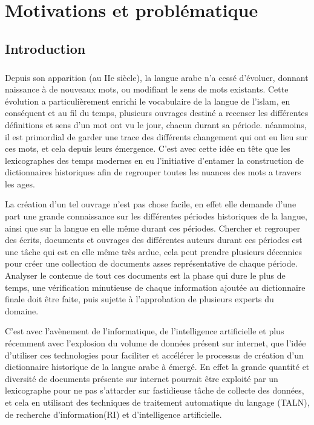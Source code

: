 \documentclass[]{report}
\begin{document}


 

\tableofcontents

\listoffigures
	
\chapter{Motivations et problématique}
	\section{Introduction}
		\paragraph{}
		Depuis son apparition (au IIe siècle), la langue arabe n'a cessé d'évoluer, donnant naissance à de nouveaux mots, ou modifiant le sens de mots existants. Cette évolution a particulièrement enrichi le vocabulaire de la langue de l'islam, en conséquent et au fil du temps, plusieurs ouvrages destiné a recenser les différentes définitions et sens d'un mot ont vu le jour, chacun durant sa période. néanmoins,  il est primordial de garder une trace des différents changement qui ont eu lieu sur ces mots, et cela depuis leurs émergence. C'est avec cette idée en tête que les lexicographes des temps modernes en eu l'initiative d'entamer la construction de dictionnaires historiques afin de regrouper toutes les nuances des mots a travers les ages.
		\par
		La création d'un tel ouvrage n'est pas chose facile, en effet elle demande d'une part une grande connaissance sur les différentes périodes historiques de la langue, ainsi que sur la langue en elle même durant ces périodes. Chercher et regrouper des écrits, documents et ouvrages des différentes auteurs durant ces périodes est une tâche qui est en elle même très ardue, cela peut prendre plusieurs décennies pour créer une collection de documents asses représentative de chaque période. Analyser le contenue de tout ces documents est la phase qui dure le plus de temps, une vérification minutieuse de chaque information ajoutée au dictionnaire finale doit être faite, puis sujette à l'approbation de plusieurs experts du domaine.
		\par
		C'est avec l'avènement de l'informatique, de l'intelligence artificielle et plus récemment avec l'explosion du volume de données présent sur internet, que l'idée d'utiliser ces technologies pour faciliter et accélérer le processus de création d'un dictionnaire historique de la langue arabe à émergé. En effet la grande quantité et diversité de documents présente sur internet pourrait être exploité par un lexicographe pour ne pas s'attarder sur fastidieuse tâche de collecte des données, et cela en utilisant des techniques de traitement automatique du langage (TALN), de recherche d'information(RI) et d'intelligence artificielle.
\end{document}
